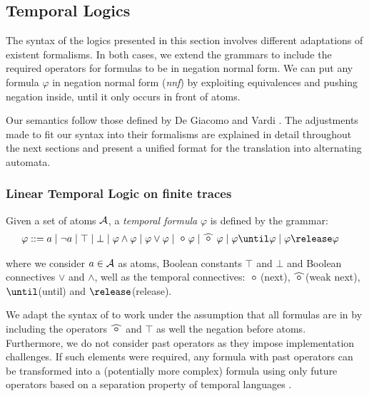 

\subsection{Temporal Logics }

The syntax of the logics presented in this section involves different adaptations of existent formalisms. In both cases, we extend the grammars to include the required operators for formulas to be in negation normal form. We can put any formula $\varphi$ in negation normal form (\textit{nnf}) by exploiting equivalences and pushing negation inside, until it only occurs in front of atoms. 

Our semantics follow those defined by De Giacomo and Vardi \cite{giavar15a}. The adjustments made to fit our syntax into their formalisms are explained in detail throughout the next sections and present a unified format for the translation into alternating automata.


\subsubsection{Linear Temporal Logic on finite traces \LTLf}


Given a set of atoms $\mathcal{A }$, a \emph{temporal formula} $\varphi$ is defined by the grammar: 
\begin{align*}
    \varphi ::= &\; a \mid \neg a \mid \top \mid \bot \mid
        \varphi \wedge \varphi \mid 
        \varphi \vee \varphi \mid \Next \varphi \mid \wnext \; \varphi \mid 
        \varphi \until \varphi \mid \varphi \release \varphi
\end{align*}

where we consider $a\in\mathcal{A }$ as atoms, Boolean constants $\top$ and $\bot$ and Boolean connectives $\vee$ and $\wedge$, well as the temporal connectives: $\Next$(next), $\wnext$(weak next), $\until$(until) and $\release$(release).

We adapt the syntax of \cite{cabsch19b} to work under the assumption that all formulas are in \nnf by including the operators $\wnext$ and $\top$ as well the negation before atoms. 
Furthermore, we do not consider past operators as they impose implementation challenges. If such elements were required, any formula with past operators can be transformed into a (potentially more complex) formula using only future operators based on a separation property of temporal languages \cite{gabbay87a}.

